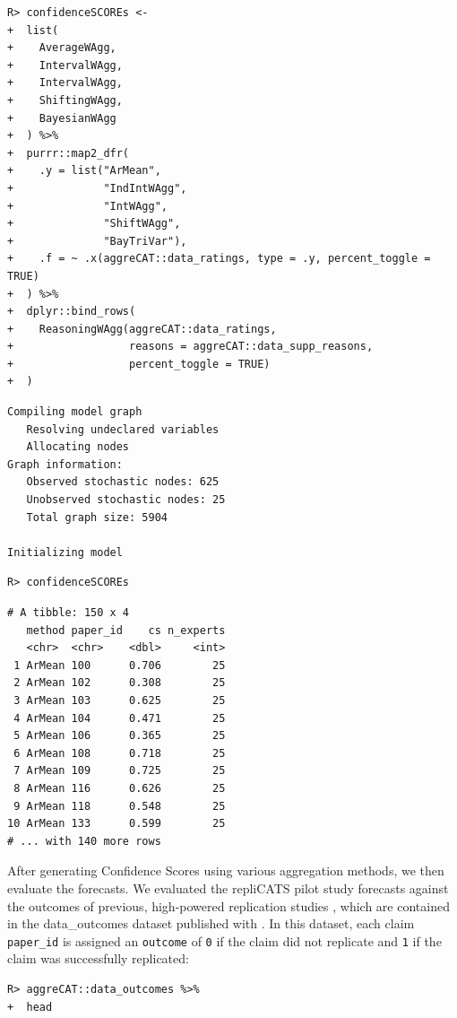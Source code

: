 \documentclass[article]{jss}
\begin{document}
\begin{verbatim}
R> confidenceSCOREs <-
+  list(
+    AverageWAgg,
+    IntervalWAgg,
+    IntervalWAgg,
+    ShiftingWAgg,
+    BayesianWAgg
+  ) %>%
+  purrr::map2_dfr(
+    .y = list("ArMean", 
+              "IndIntWAgg", 
+              "IntWAgg", 
+              "ShiftWAgg", 
+              "BayTriVar"),
+    .f = ~ .x(aggreCAT::data_ratings, type = .y, percent_toggle = TRUE)
+  ) %>% 
+  dplyr::bind_rows(
+    ReasoningWAgg(aggreCAT::data_ratings, 
+                  reasons = aggreCAT::data_supp_reasons, 
+                  percent_toggle = TRUE)
+  )
\end{verbatim}

\begin{verbatim}
Compiling model graph
   Resolving undeclared variables
   Allocating nodes
Graph information:
   Observed stochastic nodes: 625
   Unobserved stochastic nodes: 25
   Total graph size: 5904

Initializing model
\end{verbatim}

\begin{verbatim}
R> confidenceSCOREs
\end{verbatim}

\begin{verbatim}
# A tibble: 150 x 4
   method paper_id    cs n_experts
   <chr>  <chr>    <dbl>     <int>
 1 ArMean 100      0.706        25
 2 ArMean 102      0.308        25
 3 ArMean 103      0.625        25
 4 ArMean 104      0.471        25
 5 ArMean 106      0.365        25
 6 ArMean 108      0.718        25
 7 ArMean 109      0.725        25
 8 ArMean 116      0.626        25
 9 ArMean 118      0.548        25
10 ArMean 133      0.599        25
# ... with 140 more rows
\end{verbatim}

After generating Confidence Scores using various aggregation methods, we
then evaluate the forecasts. We evaluated the repliCATS pilot study
forecasts against the outcomes of previous, high-powered replication
studies \citep{Hanea2021}, which are contained in the {data\_outcomes}
dataset published with . In this dataset, each claim
\texttt{paper\_id} is assigned an \texttt{outcome} of \texttt{0} if the
claim did not replicate and \texttt{1} if the claim was successfully
replicated:

\begin{verbatim}
R> aggreCAT::data_outcomes %>% 
+  head
\end{verbatim}
\end{document}
